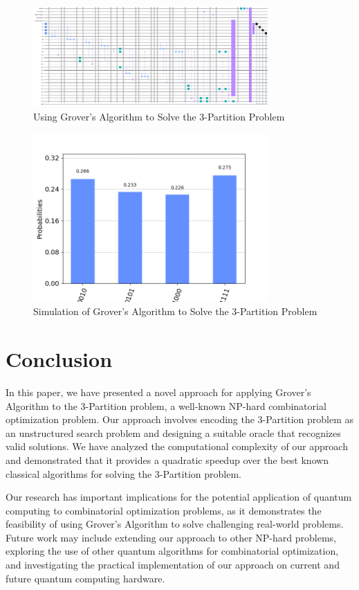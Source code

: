 \begin{figure}[htp]
    \centering
    \includegraphics[width=9cm]{Figures/3-Partition_circuit.png}
    \caption{Using Grover's Algorithm to Solve the 3-Partition Problem}
    \label{fig:3-Partition}
\end{figure}


\begin{figure}[htp]
    \centering
    \includegraphics[width=9cm]{Figures/3-Partition_hist.png}
    \caption{Simulation of Grover's Algorithm to Solve the 3-Partition Problem}
    \label{hist:3-Partition}
\end{figure}

\section{Conclusion}
\label{sec:conclusion}

In this paper, we have presented a novel approach for applying Grover's Algorithm to the 3-Partition problem, a well-known NP-hard combinatorial optimization problem. Our approach involves encoding the 3-Partition problem as an unstructured search problem and designing a suitable oracle that recognizes valid solutions. We have analyzed the computational complexity of our approach and demonstrated that it provides a quadratic speedup over the best known classical algorithms for solving the 3-Partition problem.

Our research has important implications for the potential application of quantum computing to combinatorial optimization problems, as it demonstrates the feasibility of using Grover's Algorithm to solve challenging real-world problems. Future work may include extending our approach to other NP-hard problems, exploring the use of other quantum algorithms for combinatorial optimization, and investigating the practical implementation of our approach on current and future quantum computing hardware.

